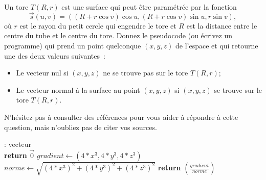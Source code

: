 \documentclass[12pt,addpoints]{exam}
\begin{document}
\begin{questions}

\question[20]
Un tore $T(R,r)$ est une surface qui peut être paramétrée par la fonction
$$\vec{s}(u,v) = ((R + r\cos v) \cos u, (R + r\cos v) \sin u, r\sin v),$$
où $r$ est le rayon du petit cercle qui engendre le tore et $R$ est la distance entre le centre du tube et le centre du tore. Donnez le pseudocode (ou écrivez un programme) qui prend un point quelconque $(x,y,z)$ de l'espace et qui retourne une des deux valeurs suivantes~:
\begin{itemize}
  \item Le vecteur nul si $(x,y,z)$ ne se trouve pas sur le tore $T(R,r)$;
  \item Le vecteur normal à la surface au point $(x,y,z)$ si $(x,y,z)$ se trouve sur le tore $T(R,r)$.
\end{itemize}
N'hésitez pas à consulter des références pour vous aider à répondre à cette question, mais n'oubliez pas de citer vos sources.
\begin{solution}
    \begin{algorithmic}[1]
     : {vecteur} \\
      \State \textbf{return} $\overrightarrow{0}$
    \Else
      \State $gradient \gets (4*x^3,4*y^3,4*z^3)$
      \State $norme \gets \sqrt{(4*x^3)^2 + (4*y^3)^2 + (4*z^3)^2}$
      \State \textbf{return} $ \left( \frac{gradient}{norme} \right)$
    \EndIf
    \EndFunction
    \end{algorithmic}
\end{solution}


\end{questions}
\end{document}

